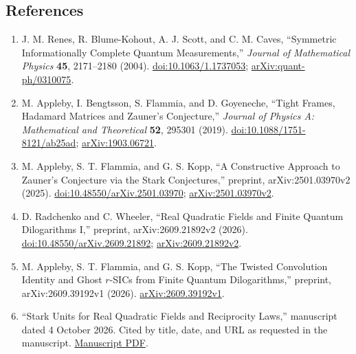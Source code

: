 \subsection*{References}

\begin{enumerate}[label={},leftmargin=4.8em,labelsep=0.5em]
  \footnotesize
  \item[\textup{[RBS+04]}]\label{ref:p18-renes}
  J. M. Renes, R. Blume-Kohout, A. J. Scott, and C. M. Caves,
  ``Symmetric Informationally Complete Quantum Measurements,''
  \emph{Journal of Mathematical Physics} \textbf{45}, 2171--2180 (2004).
  \href{https://doi.org/10.1063/1.1737053}{doi:10.1063/1.1737053};
  \href{https://arxiv.org/abs/quant-ph/0310075}{arXiv:quant-ph/0310075}.

  \item[\textup{[ABFG19]}]\label{ref:p18-appleby-data}
  M. Appleby, I. Bengtsson, S. Flammia, and D. Goyeneche,
  ``Tight Frames, Hadamard Matrices and Zauner's Conjecture,''
  \emph{Journal of Physics A: Mathematical and Theoretical} \textbf{52},
  295301 (2019).
  \href{https://doi.org/10.1088/1751-8121/ab25ad}{doi:10.1088/1751-8121/ab25ad};
  \href{https://arxiv.org/abs/1903.06721}{arXiv:1903.06721}.

  \item[\textup{[AFK25]}]\label{ref:p18-appleby-stark}
  M. Appleby, S. T. Flammia, and G. S. Kopp,
  ``A Constructive Approach to Zauner's Conjecture via the Stark
  Conjectures,'' preprint, arXiv:2501.03970v2 (2025).
  \href{https://doi.org/10.48550/arXiv.2501.03970}{doi:10.48550/arXiv.2501.03970};
  \href{https://arxiv.org/abs/2501.03970v2}{arXiv:2501.03970v2}.

  \item[\textup{[RW26]}]\label{ref:p18-radchenko-wheeler}
  D. Radchenko and C. Wheeler,
  ``Real Quadratic Fields and Finite Quantum Dilogarithms I,''
  preprint, arXiv:2609.21892v2 (2026).
  \href{https://doi.org/10.48550/arXiv.2609.21892}{doi:10.48550/arXiv.2609.21892};
  \href{https://arxiv.org/abs/2609.21892v2}{arXiv:2609.21892v2}.

  \item[\textup{[AFK26]}]\label{ref:p18-twisted-convolution}
  M. Appleby, S. T. Flammia, and G. S. Kopp,
  ``The Twisted Convolution Identity and Ghost $r$-SICs from Finite
  Quantum Dilogarithms,'' preprint, arXiv:2609.39192v1 (2026).
  \href{https://arxiv.org/abs/2609.39192v1}{arXiv:2609.39192v1}.

  \item[\textup{[SU26]}]\label{ref:p18-stark-reciprocity}
  ``Stark Units for Real Quadratic Fields and Reciprocity Laws,''
  manuscript dated 4 October 2026. Cited by title, date, and URL as requested
  in the manuscript.
  \href{https://www.danrad.net/papers/stark-reciprocity.pdf}{Manuscript PDF}.
\end{enumerate}

